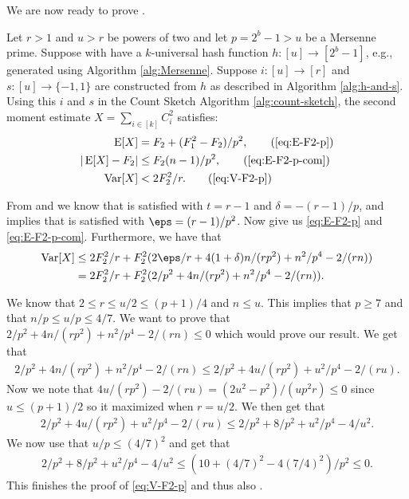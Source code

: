 We are now ready to prove .
\begingroup
    \def\thelemma{\ref{thm:h-and-s-p}}
    \begin{theorem}
        Let $r>1$ and $u>r$ be powers of two and let $p=2^b-1>u$ be a
        Mersenne prime.
        Suppose with have a $k$-universal hash function $h:[u]\to[2^b-1]$, e.g.,
        generated using Algorithm \ref{alg:Mersenne}. Suppose
        $i:[u]\to[r]$ and
        $s:[u]\to\{-1,1\}$ are constructed from $h$ as described in
        Algorithm \ref{alg:h-and-s}. Using this $i$ and $s$ 
        in the Count Sketch Algorithm \ref{alg:count-sketch}, the second moment 
        estimate $X=\sum_{i\in[k]} C_i^2$ satisfies:
        \begin{align*}
           \E[X] &= F_2+(F_1^2-F_2)/p^2, \tag{\ref{eq:E-F2-p}}\\
           | \E[X] - F_2 | &\le F_2 (n - 1)/p^2, \tag{\ref{eq:E-F2-p-com}}\\
           \Var[X]&< 2F_2^2/r.\tag{\ref{eq:V-F2-p}}
        \end{align*}
    \end{theorem}
    \addtocounter{lemma}{-1}
\endgroup

From  and  we know
that  is satisfied with $t = r - 1$
and $\delta = -(r - 1)/p$, and  implies that
 is satisfied with $\eps = (r - 1)/p^2$.
Now  give us \eqref{eq:E-F2-p}
and \eqref{eq:E-F2-p-com}. Furthermore, we have that
\begin{align*}
    \Var[X] 
        &\le 2F_2^2/r + F_2^2 (2\eps/r + 4(1 + \delta)n / (rp^2) + n^2/p^4 - 2 /(rn))
        \\&= 2F_2^2/r + F_2^2(2/p^2 + 4n/(r p^2) + n^2/p^4 - 2/(rn)) .
\end{align*}

We know that $2 \le r \le u/2 \le (p + 1)/4$ and $n \le u$.
This implies that $p \ge 7$ and that $n/p \le u/p \le 4/7$.
We want to prove that
$2/p^2 + 4n/(r p^2) + n^2/p^4 - 2/(rn) \le 0$ which would
prove our result. We get that
\begin{align*}
    2/p^2 + 4n/(r p^2) + n^2/p^4 - 2/(rn)
        \le 2/p^2 + 4u/(r p^2) + u^2/p^4 - 2/(ru) .
\end{align*}
Now we note that $4u/(r p^2) - 2/(ru) = (2u^2 - p^2)/(u p^2 r) \le 0$
since $u \le (p + 1)/2$ so it maximized when $r = u/2$. We then get
that
\begin{align*}
    2/p^2 + 4u/(r p^2) + u^2/p^4 - 2/(ru)
        \le 2/p^2 + 8/p^2 + u^2 / p^4 - 4/u^2 .
\end{align*}
We now use that $u/p \le (4/7)^2$ and get that
\begin{align*}
    2/p^2 + 8/p^2 + u^2 / p^4 - 4/u^2
        \le (10 + (4/7)^2 - 4 (7/4)^2)/p^2
        \le 0 .
\end{align*}
This finishes the proof of \eqref{eq:V-F2-p} and thus also .

